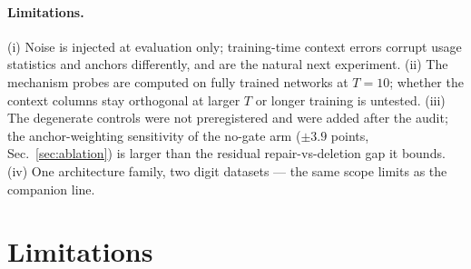 \documentclass[10pt]{article}
\begin{document}
\paragraph{Limitations.} (i) Noise is injected at evaluation only;
training-time context errors corrupt usage statistics and anchors
differently, and are the natural next experiment. (ii) The mechanism
probes are computed on fully trained networks at $T{=}10$; whether the
context columns stay orthogonal at larger $T$ or longer training is
untested. (iii) The degenerate controls were not preregistered and were
added after the audit; the anchor-weighting sensitivity of the no-gate
arm ($\pm 3.9$ points, Sec.~\ref{sec:ablation}) is larger than the
residual repair-vs-deletion gap it bounds. (iv) One architecture
family, two digit datasets --- the same scope limits as the companion
line.



\section{Limitations}
\label{sec:limitations}
\end{document}
